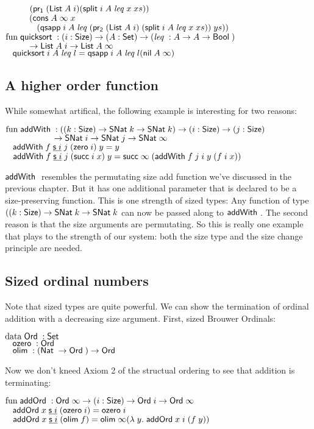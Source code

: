 \begin{bsp}
$\spcx	(\pra (\List A\; i) (\pivot i\; A\; \lleq x\; xs))$\\
$\spcx	(\cons A\; \infty \; x\; $\\
$\spcx	\spc   (\qsapp i\; A\; \lleq (\prb (\List A\; i) \; (\pivot i\; A\; \lleq x\; xs))\; ys))$\\
$\mathrm{fun}\; \mathsf{quicksort}\; : (i : \mathsf{Size} ) \rightarrow (A : \mathsf{Set} ) \rightarrow (\mathit{leq}\; : A \rightarrow A \rightarrow \mathsf{Bool}\;)$\\ 
$\spcx	\ra \List A\; i \ra \List A\; \infty$\\
$\hspace*{3mm} \mathsf{quicksort}\; i\; A\; \mathit{leq}\; l = \mathsf{qsapp}\; i\; A\; \mathit{leq}\; l (\mathsf{nil}\; A\; \infty)$ 
\end{bsp}

\subsection{A higher order function}
While somewhat artifical, the following example is interesting for two reasons:
\begin{bsp}
$\mathrm{fun}\; \mathsf{addWith}\; : ((k : \mathsf{Size} ) \rightarrow \mathsf{SNat}\; k \rightarrow \mathsf{SNat}\; k ) \rightarrow (i : \mathsf{Size} ) \rightarrow (j : \mathsf{Size} ) $\\
$\spcx \spcx \ra  \SNat i \ra \SNat j \ra \SNat \infty $\\
$\hspace*{3mm} \mathsf{addWith}\; f \; \underline{\mathsf{s}\; i} \; j \; (\mathsf{zero}\; i) \; y = y $ \\
$\hspace*{3mm} \mathsf{addWith}\; f \; \underline{\mathsf{s}\; i} \; j \; (\mathsf{succ}\; i \; x) \; y = \mathsf{succ}\; \infty \; (\mathsf{addWith}\; f \; j \; i \; y \; (f \; i \; x))$
\end{bsp}
$\mathsf{addWith}\;$ resembles the permutating size add function we've discussed in the previous chapter.
But it has one additional parameter that is declared to be a size-preserving function.
This is one strength of sized types: Any function of type  $ ((k : \mathsf{Size} ) \rightarrow \mathsf{SNat}\; k \rightarrow \mathsf{SNat}\; k $ can now
be passed along to $\mathsf{addWith}\;$.
The second reason is that the size arguments are permutating. 
So this is really one example that plays to the strength of our system: both the size type and the size change principle are needed.
\subsection{Sized ordinal numbers}
Note that sized types are quite powerful. 
We can show the termination of ordinal addition with a decreasing size argument.
First, sized Brouwer Ordinals:
\begin{bsp}
$\mathrm{data}\; \mathsf{Ord}\; : \mathsf{Set}$ \\
$\hspace*{3mm} \mathsf{ozero}\; : \mathsf{Ord}\; $\\
$\hspace*{3mm} \mathsf{olim}\; : (\mathsf{Nat}\; \rightarrow \mathsf{Ord}\; ) \rightarrow \mathsf{Ord}\; $
\end{bsp}
Now we don't kneed Axiom 2 of the structual ordering to see that addition is terminating:
\begin{bsp}
$\mathrm{fun}\; \mathsf{addOrd}\; : \mathsf{Ord}\; \infty \rightarrow ( i : \mathsf{Size} ) \rightarrow{\mathsf{Ord}\;i \rightarrow\mathsf{Ord}\;\infty }$\\
$\hspace*{3mm} \mathsf{addOrd}\; x\; \underline{\mathsf{s}\; i}\; (\mathsf{ozero}\; i) = \mathsf{ozero}\; i $\\
$\hspace*{3mm} \mathsf{addOrd}\; x\; \underline{\mathsf{s}\; i}\; (\mathsf{olim}\; f)  = \mathsf{olim}\; \infty ( \lambda\; y .\; \mathsf{addOrd}\;  x \; i \; (f \; y))  $
\end{bsp}

